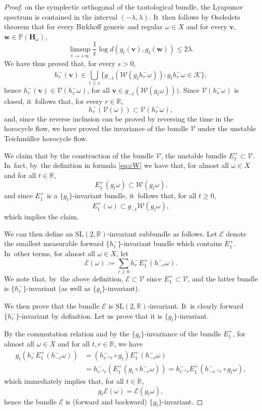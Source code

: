 \documentclass[JEP,XML,SOM,Unicode,published]{cedram}
\let\sep:
\theoremstyle{plain}
\theoremstyle{definition}
\numberwithin{equation}{subsection}
\newcommand\bP{\mathbb{P}}
\newcommand\bR{\mathbb{R}}\let\R\bR
\newcommand\cE{\mathcal{E}}
\newcommand\cK{\mathcal{K}}
\newcommand\cV{\mathcal{V}}
\newcommand\cW{\mathcal{W}}
\newcommand{\SL}{\mathrm{SL}}
\newcommand{\bfH}{\boldsymbol{H}}
\newcommand{\bfv}{\boldsymbol{v}}
\newcommand{\bfw}{\boldsymbol{w}}
\begin{document}
\begin{proof}
on the symplectic orthogonal of the tautological bundle, the Lyapunov spectrum is contained in the interval $(-\lambda, \lambda)$. It~then follows by Oseledets theorem that for every Birkhoff generic and regular $\omega\in X$ and for every ${\bfv}$, ${\bfw} \in \bP(\bfH_\omega)$,\vspace*{-3pt}
\[
\limsup_{t\to +\infty} \frac{1}{t} \log d(g_t({\bfv}), g_t({\bfw})) \leq 2 \lambda.
\]
We have thus proved that, for every $s>0$,
\[
h^-_r ({\bfv}) \in \overline{\bigcup_{t\geq s} \{ g_{-t} \left(\cW (g_{t}h^-_r\omega)\right) \sep g_{t}h^-_r\omega \in \cK\} },
\]
hence $h^-_r ({\bfv}) \in \cV (h^-_r\omega)$, for all ${\bfv} \in g_{-t} (\cW(g_{t} \omega)))$. Since $\cV (h^-_r\omega)$ is closed, it~follows that, for every $r\in \R$,\vspace*{-3pt}
\[
h^-_r \left(\cV (\omega) \right)
\subset \cV (h^-_r\omega),
\]
and, since the reverse inclusion can be proved by reversing the time in the horocycle flow, we have proved the invariance of the bundle $\cV$
under the unstable Teichmüller horocycle flow.

We claim that by the construction of the bundle $\cV$, the unstable bundle $E^+_1 \subset \cV$. In~fact, by~the definition in formula \eqref{eq:cW} we have that, for almost all $\omega \in X$ and for all $t\in \R$,\vspace*{-3pt}
\[
E^+_1 (g_{t} \omega) \subset \cW(g_{t}\omega).
\]
and since $E^+_1$ is a $\{g_t\}$-invariant bundle, it~follows that, for all $t\geq 0$,
\[
E^+_1 (\omega) \subset g_{-t} \cW(g_{t}\omega),
\]
which implies the claim.

We can then define an $\SL(2, \R)$-invariant subbundle as follows. Let $\cE$ denote the smallest measurable forward $\{h^-_r\}$-invariant bundle which contains $E^+_1$. In~other terms, for almost
all $\omega \in X$, let
\[
\cE(\omega) := \sum_{r\geq 0}
h^-_r E^+_1 (h^-_{-r} \omega).
\]
We note that, by~the above definition, $\cE \subset \cV$ since $E^+_1 \subset \cV$, and the latter bundle is $\{h^-_r\}$-invariant (as well as $\{g_t\}$-invariant).

We then prove that the bundle $\cE$
is $\SL(2,\bR)$-invariant. It~is clearly forward $\{h^-_r\}$-invariant by definition. Let us
prove that it is $\{g_t\}$-invariant.

By the commutation relation and by the $\{g_t\}$-invariance of the bundle $E^+_1$,
for almost all $\omega \in X$ and for all $t, r\in \R$, we have
\[
\begin{aligned}
g_t \left(h^-_r E^+_1 (h^-_{-r} \omega)\right) &=
(h^-_{e^{-t} r}\circ g_t) E^+_1 (h^-_{-r} \omega) \\ &= h^-_{e^{-t} r} \left(E^+_1 (g_t\circ h^-_{-r} \omega) \right) =
h^-_{e^{-t} r} E^+_1 (h^-_{-e^{-t}r} \circ g_t\omega),
\end{aligned}
\]
which immediately implies that, for all $t\in \R$,
\[
g_t \cE(\omega) = \cE (g_t\omega),
\]
hence the bundle $\cE$ is (forward and backward) $\{g_t\}$-invariant.


\end{proof}
\end{document}
